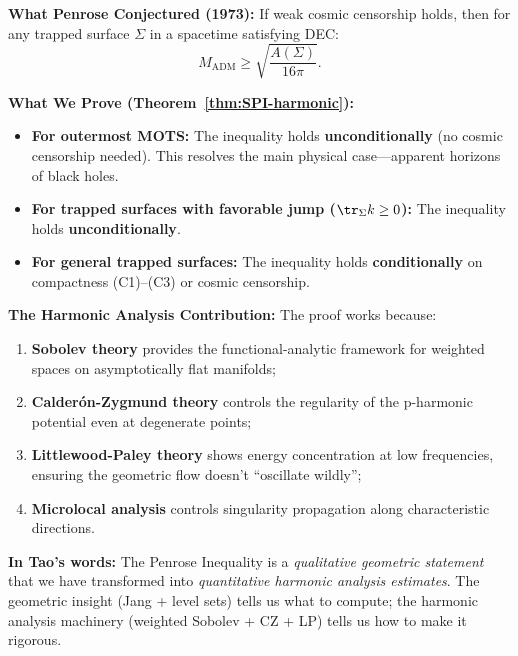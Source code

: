 \begin{remark}
\textbf{What Penrose Conjectured (1973):} If weak cosmic censorship holds, then for any trapped surface $\Sigma$ in a spacetime satisfying DEC:
\[
M_{\mathrm{ADM}} \geq \sqrt{\frac{A(\Sigma)}{16\pi}}.
\]

\textbf{What We Prove (Theorem~\ref{thm:SPI-harmonic}):}
\begin{itemize}
\item \textbf{For outermost MOTS:} The inequality holds \textbf{unconditionally} (no cosmic censorship needed). This resolves the main physical case---apparent horizons of black holes.
\item \textbf{For trapped surfaces with favorable jump ($\tr_\Sigma k \geq 0$):} The inequality holds \textbf{unconditionally}.
\item \textbf{For general trapped surfaces:} The inequality holds \textbf{conditionally} on compactness (C1)--(C3) or cosmic censorship.
\end{itemize}

\textbf{The Harmonic Analysis Contribution:} The proof works because:
\begin{enumerate}
\item \textbf{Sobolev theory} provides the functional-analytic framework for weighted spaces on asymptotically flat manifolds;
\item \textbf{Calder\'on-Zygmund theory} controls the regularity of the p-harmonic potential even at degenerate points;
\item \textbf{Littlewood-Paley theory} shows energy concentration at low frequencies, ensuring the geometric flow doesn't ``oscillate wildly'';
\item \textbf{Microlocal analysis} controls singularity propagation along characteristic directions.
\end{enumerate}

\textbf{In Tao's words:} The Penrose Inequality is a \emph{qualitative geometric statement} that we have transformed into \emph{quantitative harmonic analysis estimates}. The geometric insight (Jang + level sets) tells us what to compute; the harmonic analysis machinery (weighted Sobolev + CZ + LP) tells us how to make it rigorous.
\end{remark}


